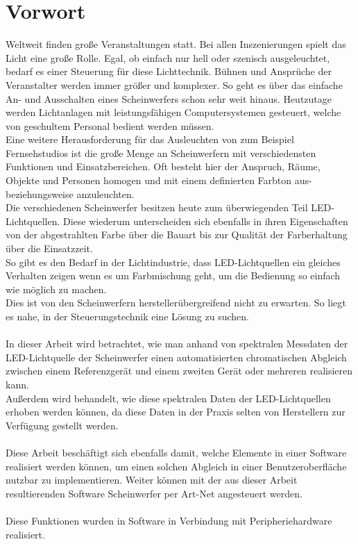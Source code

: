 \documentclass[11pt]{scrartcl}
\begin{document}
\section*{Vorwort}
Weltweit finden große Veranstaltungen statt. Bei allen Inszenierungen spielt das Licht eine
große Rolle. Egal, ob einfach nur hell oder szenisch ausgeleuchtet, bedarf es einer Steuerung
für diese Lichttechnik. Bühnen und Ansprüche der Veranstalter werden immer größer und komplexer.
So geht es über das einfache An- und Ausschalten eines Scheinwerfers schon sehr weit hinaus.
Heutzutage werden Lichtanlagen mit leistungsfähigen Computersystemen gesteuert, welche von
geschultem Personal bedient werden müssen.\\
Eine weitere Herausforderung für das Ausleuchten von zum Beispiel Fernsehstudios ist die große
Menge an Scheinwerfern mit verschiedensten Funktionen und Einsatzbereichen. Oft besteht hier
der Anspruch, Räume, Objekte und Personen homogen und mit einem definierten Farbton aus-
beziehungsweise anzuleuchten.\\
Die verschiedenen Scheinwerfer besitzen heute zum überwiegenden Teil LED-Lichtquellen. Diese
wiederum unterscheiden sich ebenfalls in ihren Eigenschaften von der abgestrahlten Farbe über
die Bauart bis zur Qualität der Farberhaltung über die Einsatzzeit.\\
So gibt es den Bedarf in der Lichtindustrie, dass LED-Lichtquellen ein gleiches Verhalten zeigen
wenn es um Farbmischung geht, um die Bedienung so einfach wie möglich zu machen.\\
Dies ist von den Scheinwerfern herstellerübergreifend nicht zu erwarten. So liegt es nahe, in der
Steuerungstechnik eine Lösung zu suchen.\\
\\
In dieser Arbeit wird betrachtet, wie man anhand von spektralen Messdaten der LED-Lichtquelle der
Scheinwerfer einen automatisierten chromatischen Abgleich zwischen einem Referenzgerät und einem
zweiten Gerät oder mehreren realisieren kann.\\
Außerdem wird behandelt, wie diese spektralen Daten der LED-Lichtquellen erhoben werden können, da
diese Daten in der Praxis selten von Herstellern zur Verfügung gestellt werden.\\
\\
Diese Arbeit beschäftigt sich ebenfalls damit, welche Elemente in einer Software realisiert werden
können, um einen solchen Abgleich in einer Benutzeroberfläche nutzbar zu implementieren. Weiter
können mit der aus dieser Arbeit resultierenden Software Scheinwerfer per Art-Net angesteuert werden.\\
\\
Diese Funktionen wurden in Software in Verbindung mit Peripheriehardware realisiert.
\clearpage
\end{document}
